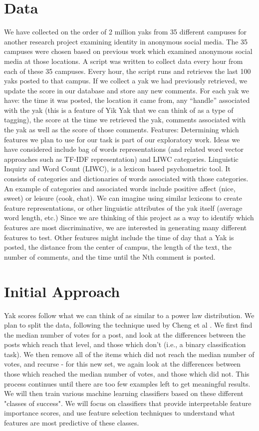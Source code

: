 \documentclass{sigchi}
\begin{document}
\section{Data}
We have collected on the order of 2 million yaks from 35 different campuses for another research project examining identity in anonymous social media. The 35 campuses were chosen based on previous work which examined anonymous social media at those locations. A script was written to collect data every hour from each of these 35 campuses. Every hour, the script runs and retrieves the last 100 yaks posted to that campus. If we collect a yak we had previously retrieved, we update the score in our database and store any new comments. For each yak we have: the time it was posted, the location it came from, any “handle” associated with the yak (this is a feature of Yik Yak that we can think of as a type of tagging), the score at the time we retrieved the yak, comments associated with the yak as well as the score of those comments.
Features:    Determining which features we plan to use for our task is part of our exploratory work. Ideas we have considered include bag of words representations (and related word vector approaches such as TF-IDF representation) and LIWC categories. Linguistic Inquiry and Word Count (LIWC), is a lexicon based psychometric tool. It consists of categories and dictionaries of words associated with those categories. An example of categories and associated words include positive affect (nice, sweet) or leisure (cook, chat). We can imagine using similar lexicons to create feature representations, or other linguistic attributes of the yak itself (average word length, etc.) Since we are thinking of this project as a way to identify which features are most discriminative, we are interested in generating many different features to test. Other features might include the time of day that a Yak is posted, the distance from the center of campus, the length of the text, the number of comments, and the time until the Nth comment is posted.

\section{Initial Approach}
Yak scores follow what we can think of as similar to a power law distribution. We plan to split the data, following the technique used by Cheng et al \cite{cheng_can_2014}. We first find the median number of votes for a post, and look at the differences between the posts which reach that level, and those which don't (i.e., a binary classification task). We then remove all of the items which did not reach the median number of votes, and recurse - for this new set, we again look at the differences between those which reached the median number of votes, and those which did not. This process continues until there are too few examples left to get meaningful results. We will then train various machine learning classifiers based on these different "classes of success". We will focus on classifiers that provide interpretable feature importance scores, and use feature selection techniques to understand what features are most predictive of these classes.



\end{document}
